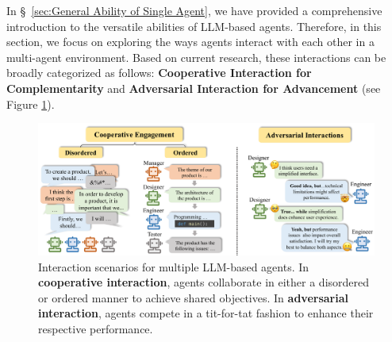 
% 
In \S \  \ref{sec:General Ability of Single Agent}, we have provided a comprehensive introduction to the versatile abilities of LLM-based agents. Therefore, in this section, we focus on exploring the ways agents interact with each other in a multi-agent environment. Based on current research, these interactions can be broadly categorized as follows: \textbf{Cooperative Interaction for Complementarity} and \textbf{Adversarial Interaction for Advancement} (see Figure \ref{fig: sec4_multi_agent}).

\begin{figure}[t]
    \centering
    \includegraphics[width=1 \textwidth]{figures/sec4_multi.pdf}
    \caption{Interaction scenarios for multiple LLM-based agents. In \textbf{cooperative interaction}, agents collaborate in either a disordered or ordered manner to achieve shared objectives. In \textbf{adversarial interaction}, agents compete in a tit-for-tat fashion to enhance their respective performance.}
    \label{fig: sec4_multi_agent}
\end{figure} 

